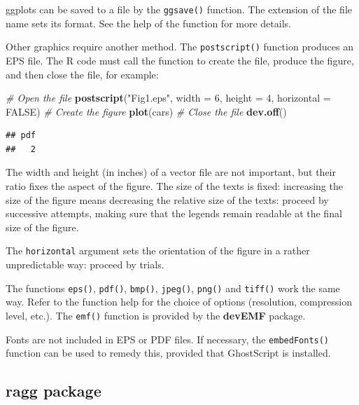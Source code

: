 \documentclass[
  12pt,
  american,
  a4paper,
  extrafontsizes,onecolumn,openright
  ]{memoir}
\newenvironment{Shaded}{\begin{snugshade}}{\end{snugshade}}
\newcommand{\AttributeTok}[1]{\textcolor[rgb]{0.13,0.29,0.53}{#1}}
\newcommand{\CommentTok}[1]{\textcolor[rgb]{0.56,0.35,0.01}{\textit{#1}}}
\newcommand{\ConstantTok}[1]{\textcolor[rgb]{0.56,0.35,0.01}{#1}}
\newcommand{\DecValTok}[1]{\textcolor[rgb]{0.00,0.00,0.81}{#1}}
\newcommand{\FunctionTok}[1]{\textcolor[rgb]{0.13,0.29,0.53}{\textbf{#1}}}
\newcommand{\NormalTok}[1]{#1}
\newcommand{\StringTok}[1]{\textcolor[rgb]{0.31,0.60,0.02}{#1}}
\begin{document}
ggplots can be saved to a file by the \texttt{ggsave()} function.
The extension of the file name sets its format.
See the help of the function for more details.

Other graphics require another method.
The \texttt{postscript()} function produces an EPS file.
The R code must call the function to create the file, produce the figure, and then close the file, for example:

\scriptsize

\begin{Shaded}
\begin{Highlighting}[]
\CommentTok{\# Open the file}
\FunctionTok{postscript}\NormalTok{(}\StringTok{"Fig1.eps"}\NormalTok{, }\AttributeTok{width =} \DecValTok{6}\NormalTok{, }\AttributeTok{height =} \DecValTok{4}\NormalTok{, }\AttributeTok{horizontal =} \ConstantTok{FALSE}\NormalTok{)}
\CommentTok{\# Create the figure}
\FunctionTok{plot}\NormalTok{(cars)}
\CommentTok{\# Close the file}
\FunctionTok{dev.off}\NormalTok{()}
\end{Highlighting}
\end{Shaded}

\begin{verbatim}
## pdf 
##   2
\end{verbatim}

\normalsize

The width and height (in inches) of a vector file are not important, but their ratio fixes the aspect of the figure.
The size of the texts is fixed: increasing the size of the figure means decreasing the relative size of the texts: proceed by successive attempts, making sure that the legends remain readable at the final size of the figure.

The \texttt{horizontal} argument sets the orientation of the figure in a rather unpredictable way: proceed by trials.

The functions \texttt{eps()}, \texttt{pdf()}, \texttt{bmp()}, \texttt{jpeg()}, \texttt{png()} and \texttt{tiff()} work the same way.
Refer to the function help for the choice of options (resolution, compression level, etc.).
The \texttt{emf()} function is provided by the \textbf{devEMF} package.

Fonts are not included in EPS or PDF files.
If necessary, the \texttt{embedFonts()} function can be used to remedy this, provided that GhostScript is installed.

\subsection{ragg package}\label{ragg-package}
\end{document}
